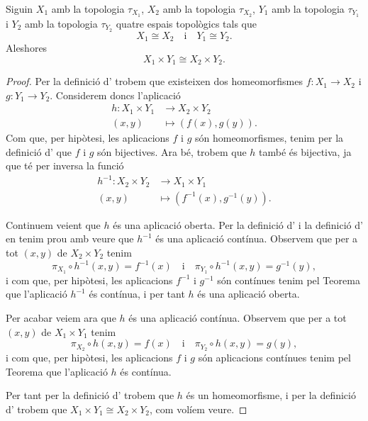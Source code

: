 \documentclass[../Apunts.tex]{subfiles}
\begin{document}
	\begin{proposition}
		\label{prop:si dues parelles d'espais topològics són homeomorfs els seus productes cartesians també ho són}
		Siguin \(X_{1}\) amb la topologia \(\tau_{X_{1}}\),  \(X_{2}\) amb la topologia \(\tau_{X_{2}}\), \(Y_{1}\) amb la topologia \(\tau_{Y_{1}}\) i \(Y_{2}\) amb la topologia \(\tau_{Y_{2}}\) quatre espais topològics tals que
		\[X_{1}\cong X_{2}\quad\text{i}\quad Y_{1}\cong Y_{2}.\]
		Aleshores
		\[X_{1}\times Y_{1}\cong X_{2}\times Y_{2}.\]
		\begin{proof}
			Per la definició d' trobem que existeixen dos homeomorfismes \(f\colon X_{1}\longrightarrow X_{2}\) i \(g\colon Y_{1}\longrightarrow Y_{2}\). Considerem doncs l'aplicació
			\begin{align*}
				h\colon X_{1}\times Y_{1}&\longrightarrow X_{2}\times Y_{2} \\
				(x,y)&\longmapsto(f(x),g(y)).
			\end{align*}
			Com que, per hipòtesi, les aplicacions \(f\) i \(g\) són homeomorfismes, tenim per la definició d' que \(f\) i \(g\) són bijectives. Ara bé, trobem que \(h\) també és bijectiva, ja que té per inversa la funció
			\begin{align*}
				h^{-1}\colon X_{2}\times Y_{2}&\longrightarrow X_{1}\times Y_{1} \\
				(x,y)&\longmapsto(f^{-1}(x),g^{-1}(y)).
			\end{align*}
			
			Continuem veient que \(h\) és una aplicació oberta. Per la definició d' i la definició d' en tenim prou amb veure que \(h^{-1}\) és una aplicació contínua. Observem que per a tot \((x,y)\) de \(X_{2}\times Y_{2}\) tenim
			\[\pi_{X_{1}}\circ h^{-1}(x,y)=f^{-1}(x)\quad\text{i}\quad\pi_{Y_{1}}\circ h^{-1}(x,y)=g^{-1}(y),\]
			i com que, per hipòtesi, les aplicacions \(f^{-1}\) i \(g^{-1}\) són contínues tenim pel Teorema  que l'aplicació \(h^{-1}\) és contínua, i per tant \(h\) és una aplicació oberta.
			
			Per acabar veiem ara que \(h\) és una aplicació contínua. Observem que per a tot \((x,y)\) de \(X_{1}\times Y_{1}\) tenim
			\[\pi_{X_{2}}\circ h(x,y)=f(x)\quad\text{i}\quad\pi_{Y_{2}}\circ h(x,y)=g(y),\]
			i com que, per hipòtesi, les aplicacions \(f\) i \(g\) són aplicacions contínues tenim pel Teorema  que l'aplicació \(h\) és contínua.
			
			Per tant per la definició d' trobem que \(h\) és un homeomorfisme, i per la definició d' trobem que \(X_{1}\times Y_{1}\cong X_{2}\times Y_{2}\), com volíem veure.
		\end{proof}
	\end{proposition}
\end{document}
